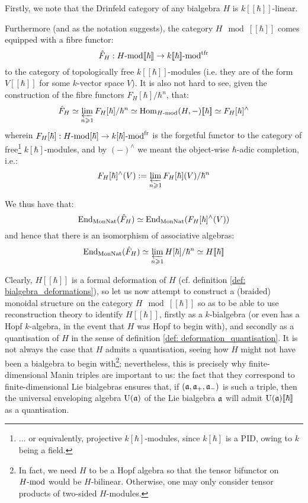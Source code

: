         \begin{remark} \label{remark: formal_properties_of_drinfeld_categories}
            Firstly, we note that the Drinfeld category of any bialgebra $H$ is $k[\![\hbar]\!]$-linear.
            
            Furthermore (and as the notation suggests), the category $H\mod[\![\hbar]\!]$ comes equipped with a fibre functor:
                $$\hat{F}_H: H\mod[\![\hbar]\!] \to k[\![\hbar]\!]\mod^{\tfr}$$
            to the category of topologically free $k[\![\hbar]\!]$-modules (i.e. they are of the form $V[\![\hbar]\!]$ for some $k$-vector space $V$). It is also not hard to see, given the construction of the fibre functors $F_H[\hbar]/\hbar^n$, that:
                $$\hat{F}_H \cong \projlim_{n \geq 1} F_H[\hbar]/\hbar^n \cong \Hom_{H\mod}(H, -)[\![\hbar]\!] \cong F_H[\hbar]^{\wedge}$$
            wherein $F_H[\hbar]: H\mod[\hbar] \to k[\hbar]\mod^{\fr}$ is the forgetful functor to the category of free\footnote{... or equivalently, projective $k[\hbar]$-modules, since $k[\hbar]$ is a PID, owing to $k$ being a field.} $k[\hbar]$-modules, and by $(-)^{\wedge}$ we meant the object-wise $\hbar$-adic completion, i.e.:
                $$F_H[\hbar]^{\wedge}(V) := \projlim_{n \geq 1} F_H[\hbar](V)/\hbar^n$$
            
            We thus have that:
                $$\End_{\Mon\Nat}(\hat{F}_H) \cong \End_{\Mon\Nat}(F_H[\hbar]^{\wedge}(V))$$
            and hence that there is an isomorphism of associative algebras:
                $$\End_{\Mon\Nat}(\hat{F}_H) \cong \projlim_{n \geq 1} H[\hbar]/\hbar^n \cong H[\![\hbar]\!]$$
        \end{remark}
        Clearly, $H[\![\hbar]\!]$ is a formal deformation of $H$ (cf. definition \ref{def: bialgebra_deformations}), so let us now attempt to construct a (braided) monoidal structure on the category $H\mod[\![\hbar]\!]$ so as to be able to use reconstruction theory to identify $H[\![\hbar]\!]$, firstly as a $k$-bialgebra (or even has a Hopf $k$-algebra, in the event that $H$ was Hopf to begin with), and secondly as a quantisation of $H$ in the sense of definition \ref{def: deformation_quantisation}. It is not always the case that $H$ admits a quantisation, seeing how $H$ might not have been a bialgebra to begin with\footnote{In fact, we need $H$ to be a Hopf algebra so that the tensor bifunctor on $H\mod$ would be $H$-bilinear. Otherwise, one may only consider tensor products of two-sided $H$-modules.}; nevertheless, this is precisely why finite-dimensional Manin triples are important to us: the fact that they correspond to finite-dimensional Lie bialgebras ensures that, if $(\a, \a_+, \a_-)$ is such a triple, then the universal enveloping algebra $\rmU(\a)$ of the Lie bialgebra $\a$ will admit $\rmU(\a)[\![\hbar]\!]$ as a quantisation.

